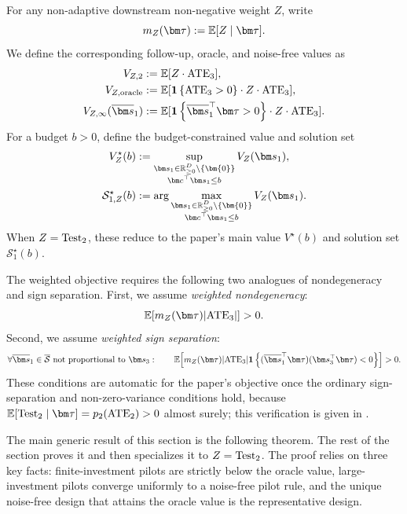 For any non-adaptive downstream non-negative weight $Z$, write
\[
  m_Z(\bm\tau)
  \defeq
  \E[Z\mid\bm\tau].
\]
We define the corresponding follow-up, oracle, and noise-free values as
\begin{align*}
  V_{Z,\followup}
  &\defeq
  \E[Z\cdot \ATE_3],\\
  V_{Z,\oracle}
  &\defeq
  \E[\indic{\ATE_3>0}\cdot Z\cdot \ATE_3],\\
  V_{Z,\noisefree}(\overline{\bm s}_1)
  &\defeq
  \E[\indic{\overline{\bm s}_1^\top\bm\tau>0}\cdot Z\cdot \ATE_3].
\end{align*}
For a budget $b>0$, define the budget-constrained value and solution set
\begin{align*}
  V_Z^\star(b)
  &\defeq
  \sup_{\substack{\bm s_1\in\R_{\geq 0}^{D} \setminus \{\bm{0}\}\\ \bm c^\top\bm s_1\le b}}
  V_Z(\bm s_1),\\
  \mathcal S_{1,Z}^\star(b)
  &\defeq
  \arg\max_{\substack{\bm s_1\in\R_{\geq 0}^{D} \setminus \{\bm{0}\}\\ \bm c^\top\bm s_1\le b}}
  V_Z(\bm s_1).
\end{align*}
When $Z=\operatorname{Test}_2$, these reduce to the paper's main value $V^\star(b)$ and solution set $\mathcal S_1^\star(b)$.

The weighted objective requires the following two analogues of nondegeneracy and sign separation.
First, we assume \emph{weighted nondegeneracy}:
\begin{equation}
  \E[m_Z(\bm\tau)|\ATE_3|]>0.
  \label{eq:weighted-nondegeneracy}
\end{equation}
Second, we assume \emph{weighted sign separation}:
\begin{equation}
  \forall \overline{\bm s}_1\in\overline{\mathcal{S}}\text{ not proportional to }\bm s_3:\qquad
  \E\!\left[
    m_Z(\bm\tau)|\ATE_3|
    \indic{(\overline{\bm s}_1^\top\bm\tau)(\bm s_3^\top\bm\tau)<0}
  \right]>0.
  \label{eq:weighted-sign-separation}
\end{equation}
These conditions are automatic for the paper's objective once the ordinary sign-separation and non-zero-variance conditions hold, because $\E[\Test_2\mid\bm\tau]=p_2(\ATE_2)>0$ almost surely; this verification is given in .

The main generic result of this section is the following theorem.
The rest of the section proves it and then specializes it to $Z=\operatorname{Test}_2$.
The proof relies on three key facts: finite-investment pilots are strictly below the oracle value, large-investment pilots converge uniformly to a noise-free pilot rule, and the unique noise-free design that attains the oracle value is the representative design.


